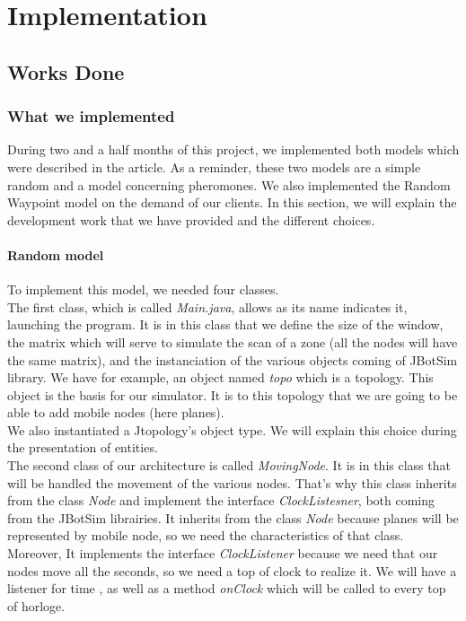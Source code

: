 \part{Implementation}

\setcounter{chapter}{0}

\chapter{Works Done}

\section{What we implemented}

During two and a half months of this project, we implemented both models which were described in the article. As a reminder, these two models are a simple random and a model concerning pheromones. We also implemented the Random Waypoint model on the demand of our clients. In this section, we will explain the development work that we have provided and the different choices.


\subsection{Random model} 

To implement this model, we needed four classes.\\
The first class, which is called \textit{Main.java}, allows as its name indicates it, launching the program. It is in this class that we define the size of the window, the matrix which will serve to simulate the scan of a zone (all the nodes will have the same matrix), and the instanciation of the various objects coming of JBotSim library. We have for example, an object named \textit{topo} which is a topology. This object is the basis for our simulator. It is to this topology that we are going to be able to add mobile nodes (here planes).\\

We also instantiated a Jtopology's object type. We will explain this choice during the presentation of entities.\\

The second class of our architecture is called \textit{MovingNode}. It is in this class that will be handled the movement of the various nodes. That's why this class inherits from the class \textit{Node} and implement the interface \textit{ClockListesner}, both coming from the JBotSim librairies. It inherits from the class \textit{Node} because planes will be represented by mobile node, so we need the characteristics of that class. Moreover, It implements the interface \textit{ClockListener} because we need that our nodes move all the seconds, so we need a top of clock to realize it. We will have a listener for time , as well as a method \textit{onClock} which will be called to every top of horloge.\\

